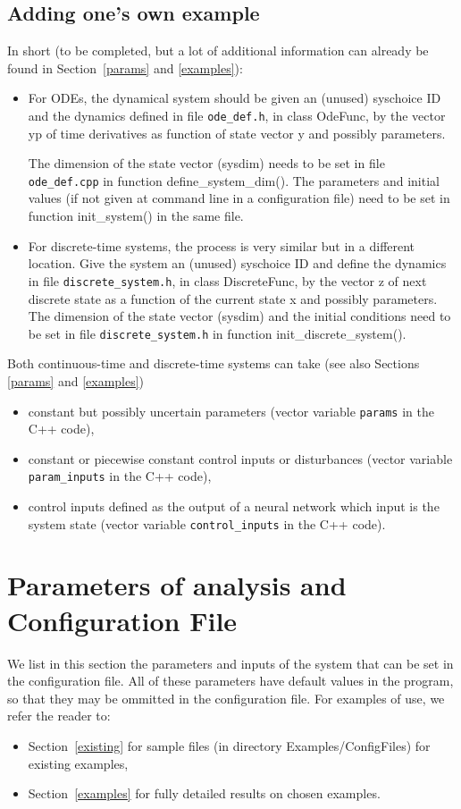 \documentclass{article}
\begin{document}
\subsection{Adding one's own example}
In short (to be completed, but a lot of additional information can already be found in Section~\ref{params} and \ref{examples}):
\begin{itemize}[noitemsep]
\item For ODEs,  the dynamical system should be given an (unused) syschoice ID and the dynamics defined in file \texttt{ode\_def.h}, in class OdeFunc,  by the vector yp  of time derivatives as function of state vector y and possibly parameters.  

The dimension of the state vector (sysdim) needs to be set in file \texttt{ode\_def.cpp} in function define\_system\_dim(). The parameters and initial values (if not given at command line in a configuration file) need to be set in function init\_system() in the same file. 

\item For discrete-time systems, the process is very similar but in a different location. Give the system  an (unused) syschoice ID and define the dynamics in file \texttt{discrete\_system.h}, in class DiscreteFunc, by the vector z of next discrete state as a function of the current state x and possibly parameters. 
The dimension of the state vector (sysdim) and the initial conditions need to be set in file \texttt{discrete\_system.h}  in function init\_discrete\_system().  
\end{itemize}
Both continuous-time and discrete-time systems can take (see also Sections \ref{params} and \ref{examples})
\begin{itemize}[noitemsep]
\item constant but possibly uncertain parameters (vector variable \texttt{params} in the C++ code),
\item constant or piecewise constant control inputs or disturbances (vector variable \texttt{param\_inputs} in the C++ code),
\item control inputs defined as the output of a neural network which input is the system state  (vector variable \texttt{control\_inputs} in the C++ code).
\end{itemize}


\section{Parameters of analysis and Configuration File \label{params}}
We list in this section the parameters and inputs of the system that can be set in the configuration file.  All of these parameters have default values in the program, so that they may be ommitted in the configuration file. 
For examples of use, we refer the reader to:
\begin{itemize}[noitemsep]
\item Section~\ref{existing} for sample files (in directory Examples/ConfigFiles) for existing examples,
\item Section~\ref{examples} for fully detailed results on chosen examples.
\end{itemize}
\end{document}
